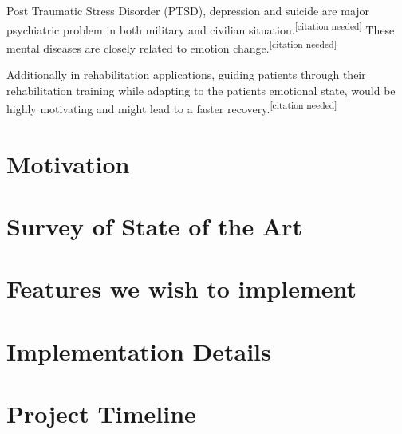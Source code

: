 \documentclass[11pt]{article}
\theoremstyle{definition}
\begin{document}
    Post Traumatic Stress Disorder (PTSD), depression and suicide are major psychiatric problem in both military and civilian situation.\textsuperscript{[citation needed]}
    These mental diseases are closely related to emotion change.\textsuperscript{[citation needed]}
    
    Additionally in rehabilitation applications, guiding patients through their rehabilitation training while adapting to the patients emotional state, would be highly motivating and might lead to a faster recovery.\textsuperscript{[citation needed]}

  \section{Motivation}

  \section{Survey of State of the Art}
    
  \section{Features we wish to implement}

  \section{Implementation Details}

  \section{Project Timeline}
  
\end{document}
